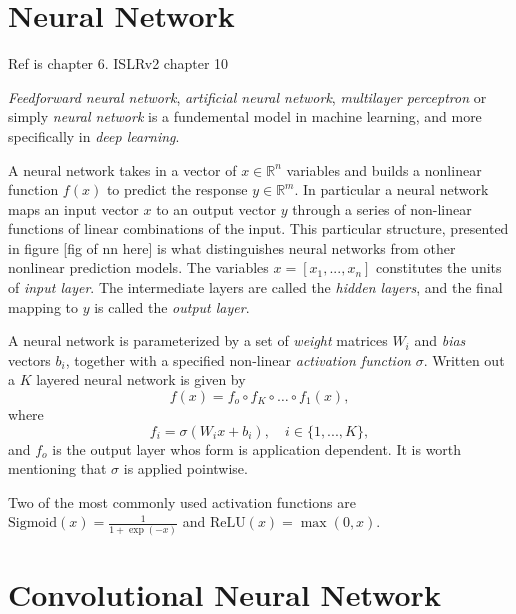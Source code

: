 \documentclass[../../thesis.tex]{subfiles}
\begin{document}

\section{Neural Network}

Ref is \cite{deeplearningbook} chapter 6. ISLRv2 chapter 10

\textit{Feedforward neural network}, \textit{artificial neural network}, \textit{multilayer perceptron} or simply \textit{neural network} is a fundemental model in machine learning, and more specifically in \textit{deep learning}. 

A neural network takes in a vector of $x \in \mathbb{R}^n$ variables and builds a nonlinear function $f(x)$ to predict the response $y\in \mathbb{R}^m$. In particular a neural network maps an input vector $x$ to an output vector $y$ through a series of non-linear functions of linear combinations of the input. This particular structure, presented in figure [fig of nn here] is what distinguishes neural networks from other nonlinear prediction models. The variables $x = [x_1,...,x_n]$ constitutes the units of \textit{input layer}. The intermediate layers are called the \textit{hidden layers}, and the final mapping to $y$ is called the \textit{output layer}.

A neural network is parameterized by a set of \textit{weight} matrices $W_i$ and \textit{bias} vectors $b_i$, together with a specified non-linear \textit{activation function} $\sigma$. Written out a $K$ layered neural network is given by 
\[ 
f(x) = f_o \circ f_K \circ \ldots \circ f_1(x),
\]
where 
$$f_i = \sigma(W_ix+b_i), \quad i \in \{1,...,K\},$$ 
and $f_o$ is the output layer whos form is application dependent. It is worth mentioning that $\sigma$ is applied pointwise.

Two of the most commonly used activation functions are $\text{Sigmoid}(x) = \tfrac{1}{1+\exp(-x)}$ and $\text{ReLU}(x) = \max(0,x)$.  





\section{Convolutional Neural Network}
\end{document}
